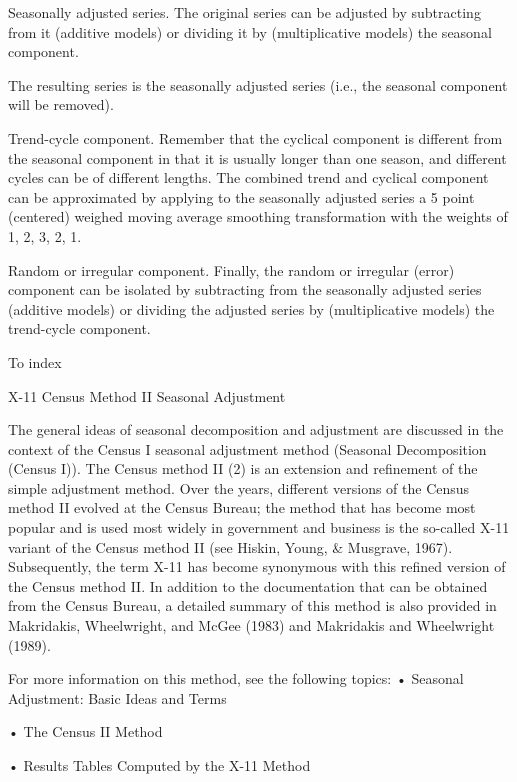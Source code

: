 Seasonally adjusted series. The original series can be adjusted by subtracting from it (additive models) or dividing it by (multiplicative models) the seasonal component.



The resulting series is the seasonally adjusted series (i.e., the seasonal component will be removed).

Trend-cycle component. Remember that the cyclical component is different from the seasonal component in that it is usually longer than one season, and different cycles can be of different lengths. The combined trend and cyclical component can be approximated by applying to the seasonally adjusted series a 5 point (centered) weighed moving average smoothing transformation with the weights of 1, 2, 3, 2, 1.

Random or irregular component. Finally, the random or irregular (error) component can be isolated by subtracting from the seasonally adjusted series (additive models) or dividing the adjusted series by (multiplicative models) the trend-cycle component.








To index
 


 

X-11 Census Method II Seasonal Adjustment

The general ideas of seasonal decomposition and adjustment are discussed in the context of the Census I seasonal adjustment method (Seasonal Decomposition (Census I)). The Census method II (2) is an extension and refinement of the simple adjustment method. Over the years, different versions of the Census method II evolved at the Census Bureau; the method that has become most popular and is used most widely in government and business is the so-called X-11 variant of the Census method II (see Hiskin, Young, & Musgrave, 1967). Subsequently, the term X-11 has become synonymous with this refined version of the Census method II. In addition to the documentation that can be obtained from the Census Bureau, a detailed summary of this method is also provided in Makridakis, Wheelwright, and McGee (1983) and Makridakis and Wheelwright (1989).

For more information on this method, see the following topics:
•
Seasonal Adjustment: Basic Ideas and Terms

•
The Census II Method

•
Results Tables Computed by the X-11 Method

